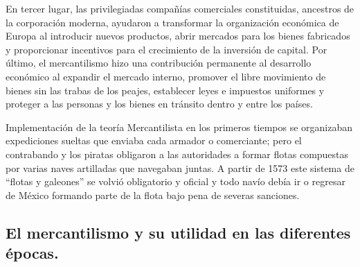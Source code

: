 \documentclass[
  jou,
  floatsintext,
  longtable,
  a4paper,
  nolmodern,
  notxfonts,
  notimes,
  colorlinks=true,linkcolor=blue,citecolor=blue,urlcolor=blue]{apa7}
\begin{document}
En tercer lugar, las privilegiadas compañías comerciales constituidas,
ancestros de la corporación moderna, ayudaron a transformar la
organización económica de Europa al introducir nuevos productos, abrir
mercados para los bienes fabricados y proporcionar incentivos para el
crecimiento de la inversión de capital. Por último, el mercantilismo
hizo una contribución permanente al desarrollo económico al expandir el
mercado interno, promover el libre movimiento de bienes sin las trabas
de los peajes, establecer leyes e impuestos uniformes y proteger a las
personas y los bienes en tránsito dentro y entre los países.

Implementación de la teoría Mercantilista en los primeros tiempos se
organizaban expediciones sueltas que enviaba cada armador o comerciante;
pero el contrabando y los piratas obligaron a las autoridades a formar
flotas compuestas por varias naves artilladas que navegaban juntas. A
partir de 1573 este sistema de ``flotas y galeones'' se volvió
obligatorio y oficial y todo navío debía ir o regresar de México
formando parte de la flota bajo pena de severas sanciones.

\subsection{El mercantilismo y su utilidad en las diferentes
épocas.}\label{el-mercantilismo-y-su-utilidad-en-las-diferentes-uxe9pocas.}
\end{document}
